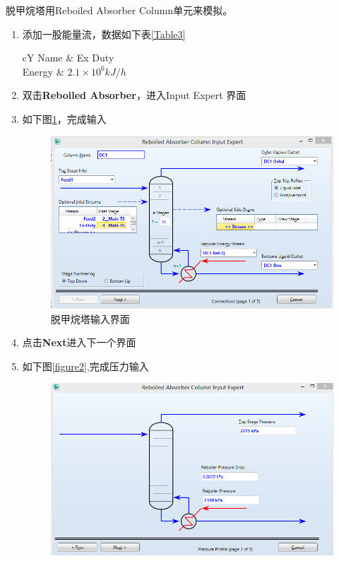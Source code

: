 \documentclass[UTF8]{ctexart}
\begin{document}
脱甲烷塔用Reboiled Absorber Column单元来模拟。
\begin{enumerate}
	\item 添加一股能量流，数据如下表\ref{Table3}

		\begin{table}[!htbp]
	\centering
	\caption{Ex Duty}
	\label{Table3}
		\begin{tabularx}{\textwidth}{cY}
		\toprule
		Name & Ex Duty \\
		\midrule
		Energy & $2.1\times10^6kJ/h$\\
		\bottomrule
		\end{tabularx}
	\end{table}

	\item 双击\textbf{Reboiled Absorber}，进入Input Expert 界面
	\item 如下图\ref{figure1}，完成输入
	\begin{figure}[!htbp]
		\centering
		\includegraphics[scale=0.5]{DC1_Input.PNG}
		\caption{脱甲烷塔输入界面}
		\label{figure1}
	\end{figure}
	\item 点击\textbf{Next}进入下一个界面
	\item 如下图\ref{figure2},完成压力输入
	\begin{figure}[!htbp]
	\centering
	\includegraphics[scale=0.5]{DC1_Pressure.PNG}

\end{figure}
\end{enumerate}
\end{document}
